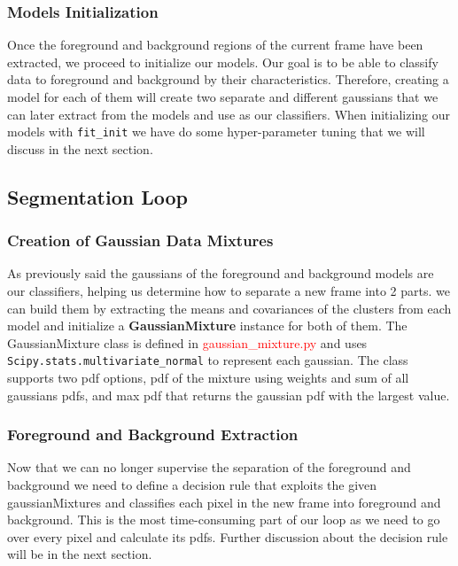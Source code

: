 \documentclass[12pt]{article}
\begin{document}
\subsubsection{Models Initialization}
Once the foreground and background regions of the current frame have been extracted, we proceed to initialize our models.
Our goal is to be able to classify data to foreground and background by their characteristics.
Therefore, creating a model for each of them will create two separate and different gaussians that we can later extract from the models and use as our classifiers.
When initializing our models with \texttt{fit\_init} we have do some hyper-parameter tuning that we will discuss in the next section.
\pagebreak
\subsection{Segmentation Loop}\label{subsec: segment-loop}
\subsubsection{Creation of Gaussian Data Mixtures}\label{subsubsec:gaussians}
As previously said the gaussians of the foreground and background models are our classifiers, helping us determine how to separate a new frame into 2 parts.
we can build them by extracting the means and covariances of the clusters from each model and initialize a \textbf{GaussianMixture} instance for both of them.
The GaussianMixture class is defined in \textcolor{red}{gaussian\_mixture.py} and uses \texttt{Scipy.stats.multivariate\_normal} to represent each gaussian.
The class supports two pdf options, pdf of the mixture using weights and sum of all gaussians pdfs, and max pdf that returns the gaussian pdf with the largest value.

\subsubsection{Foreground and Background Extraction}\label{subsubsec: fg-bg-extract}
Now that we can no longer supervise the separation of the foreground and background we need to define a decision rule
that exploits the given gaussianMixtures and classifies each pixel in the new frame into foreground and background.
This is the most time-consuming part of our loop as we need to go over every pixel and calculate its pdfs.
Further discussion about the decision rule will be in the next section.
\end{document}
